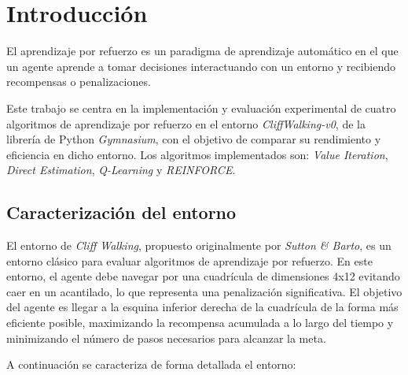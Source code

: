 \section{Introducción}

El aprendizaje por refuerzo es un paradigma de aprendizaje automático en el que un agente aprende a tomar decisiones interactuando con un entorno y recibiendo recompensas o penalizaciones. 

Este trabajo se centra en la implementación y evaluación experimental de cuatro algoritmos de aprendizaje por refuerzo en el entorno \textit{CliffWalking-v0}, de la librería de Python \textit{Gymnasium}, con el objetivo de comparar su rendimiento y eficiencia en dicho entorno. Los algoritmos implementados son: \textit{Value Iteration}, \textit{Direct Estimation}, \textit{Q-Learning} y \textit{REINFORCE}.

\subsection{Caracterización del entorno}

El entorno de \textit{Cliff Walking}, propuesto originalmente por \textit{Sutton \& Barto}, es un entorno clásico para evaluar algoritmos de aprendizaje por refuerzo. En este entorno, el agente debe navegar por una cuadrícula de dimensiones 4x12 evitando caer en un acantilado, lo que representa una penalización significativa. El objetivo del agente es llegar a la esquina inferior derecha de la cuadrícula de la forma más eficiente posible, maximizando la recompensa acumulada a lo largo del tiempo y minimizando el número de pasos necesarios para alcanzar la meta.

A continuación se caracteriza de forma detallada el entorno:

